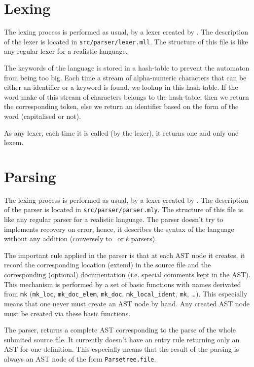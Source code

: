 
\section{Lexing}
The lexing process is performed as usual, by a lexer created by
\ocamllex. The description of the lexer is located in
{\tt src/parser/lexer.mll}. The structure of this file is like any
regular lexer for a realistic language.

The keywords of the language is stored in a hash-table to
prevent the automaton from being too big. Each time a stream of
alpha-numeric characters that can be either an identifier or a keyword
is found, we lookup in this hash-table. If the word make of this
stream of characters belongs to the hash-table, then we return the
corresponding token, else we return an identifier based on the form of
the word (capitalised or not).

As any lexer, each time it is called (by the lexer), it returns one
and only one lexem.



\section{Parsing}
The lexing process is performed as usual, by a lexer created by
\ocamlyacc. The description of the parser is located in
{\tt src/parser/parser.mly}. The structure of this file is like any
regular parser for a realistic language. The parser doesn't try to
implements recovery on error, hence, it describes the syntax of the
language without any addition (conversely to \ocaml\ or \gcc\'s
parsers).

The important rule applied in the parser is that at each AST node it
creates, it record the corresponding location (extend) in the source
file and the corresponding (optional) documentation (i.e. special
comments kept in the AST). This mechanism is performed by a set of
basic functions with names derivated from {\tt mk} ({\tt mk\_loc},
{\tt mk\_doc\_elem}, {\tt mk\_doc}, {\tt mk\_local\_ident},
{\tt mk}, \ldots). This especially
means that one never must create an AST node by hand. Any created AST
node must be created via these basic functions.

The parser, returns a complete AST corresponding to the parse of the
whole submited source file. It currently doesn't have an entry rule
returning only an AST for one definition. This especially means that
the result of the parsing is always an AST node of the form
{\tt Parsetree.file}.
